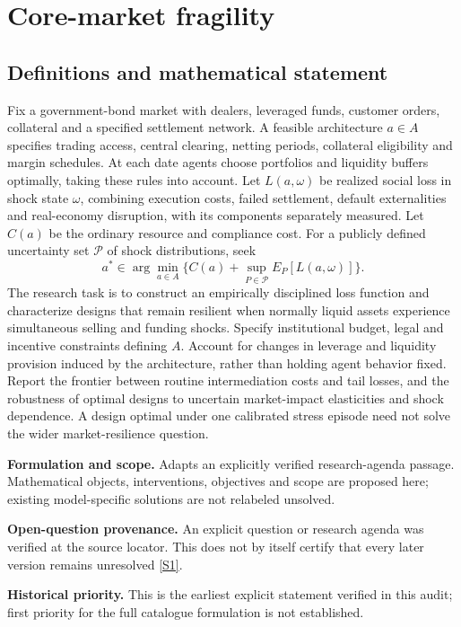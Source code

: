 \documentclass[11pt]{article}
\newcommand{\sref}[2]{\hyperlink{source:#1:#2}{[S#2]}}
\begin{document}
\section*{Core-market fragility}\label{30007599}
\subsection{Definitions and mathematical statement}
Fix a government-bond market with dealers, leveraged funds, customer orders, collateral and a specified settlement network. A feasible architecture \(a\in A\) specifies trading access, central clearing, netting periods, collateral eligibility and margin schedules. At each date agents choose portfolios and liquidity buffers optimally, taking these rules into account. Let \(L(a,\omega)\) be realized social loss in shock state \(\omega\), combining execution costs, failed settlement, default externalities and real-economy disruption, with its components separately measured. Let \(C(a)\) be the ordinary resource and compliance cost. For a publicly defined uncertainty set \(\mathcal P\) of shock distributions, seek
\[a^*\in\arg\min_{a\in A}\{C(a)+\sup_{P\in\mathcal P}E_P[L(a,\omega)]\}.\]
The research task is to construct an empirically disciplined loss function and characterize designs that remain resilient when normally liquid assets experience simultaneous selling and funding shocks. Specify institutional budget, legal and incentive constraints defining \(A\). Account for changes in leverage and liquidity provision induced by the architecture, rather than holding agent behavior fixed. Report the frontier between routine intermediation costs and tail losses, and the robustness of optimal designs to uncertain market-impact elasticities and shock dependence. A design optimal under one calibrated stress episode need not solve the wider market-resilience question.

\par\textbf{Formulation and scope.} Adapts an explicitly verified research-agenda passage. Mathematical objects, interventions, objectives and scope are proposed here; existing model-specific solutions are not relabeled unsolved.

\par\textbf{Open-question provenance.} An explicit question or research agenda was verified at the source locator. This does not by itself certify that every later version remains unresolved \sref{30007599}{1}.

\par\textbf{Historical priority.} This is the earliest explicit statement verified in this audit; first priority for the full catalogue formulation is not established.
\end{document}
